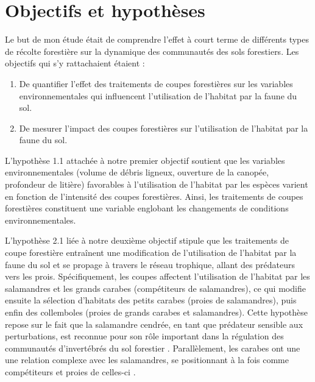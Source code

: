 \section*{Objectifs et hypothèses}
\label{sec:objectifs}

Le but de mon étude était de comprendre l’effet à court terme de différents types de récolte forestière sur la dynamique des communautés des sols forestiers. 
Les objectifs qui s’y rattachaient étaient :

\begin{enumerate}
    \item De quantifier l'effet des traitements de coupes forestières sur les variables environnementales qui influencent l'utilisation de l'habitat par la faune du sol. 
    \item De mesurer l'impact des coupes forestières sur l'utilisation de l'habitat par la faune du sol.
\end{enumerate}

L’hypothèse 1.1 attachée à notre premier objectif soutient que les variables environnementales (volume de débris ligneux, ouverture de la canopée, profondeur de litière) favorables à l’utilisation de l’habitat par les espèces varient en fonction de l’intensité des coupes forestières. 
Ainsi, les traitements de coupes forestières constituent une variable englobant les changements de conditions environnementales. 

L'hypothèse 2.1 liée à notre deuxième objectif stipule que les traitements de coupe forestière entraînent une modification de l'utilisation de l'habitat 
par la faune du sol et se propage à travers le réseau trophique, allant des prédateurs vers les prois. 
Spécifiquement, les coupes affectent l'utilisation de l'habitat par les salamandres et les grands carabes (compétiteurs de salamandres), 
ce qui modifie ensuite la sélection d'habitats des petits carabes (proies de salamandres), puis enfin des collemboles (proies de grands carabes et salamandres). 
Cette hypothèse repose sur le fait que la salamandre cendrée, en tant que prédateur sensible aux perturbations, est reconnue pour son rôle important dans la régulation des communautés d'invertébrés du sol forestier \citep{Wyman1998Experimentalassessment,MichaelWalton2005Salamandersforestfloor,Walton2006Salamandersforestfloor,Walton2013Topdownregulation,Hickerson2017Easternredbacked}. 
Parallèlement, les carabes ont une une relation complexe avec les salamandres, se positionnant à la fois comme compétiteurs et proies de celles-ci \citep{Jaeger1980MicrohabitatsTerrestrial,loveiEcologyBehaviorGround1996,Gall2003behavioralinteractions}. 


\cleardoublepage




